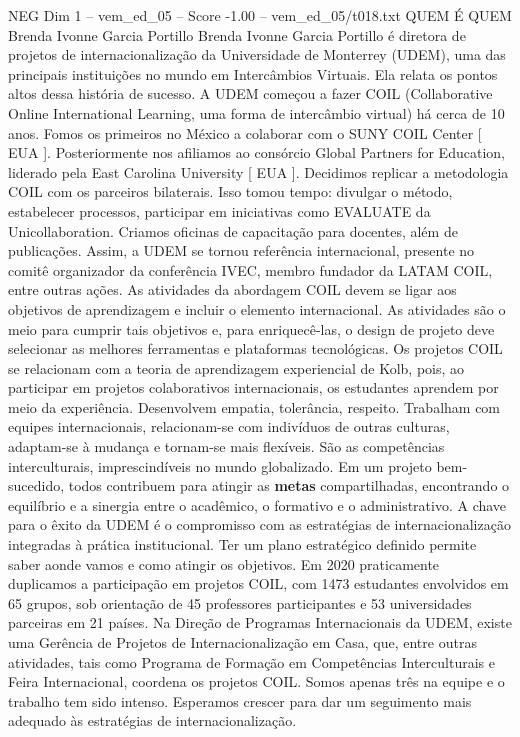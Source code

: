 \begin{textsample}{NEG Dim 1 – vem\_ed\_05 – Score -1.00 – vem\_ed\_05/t018.txt}  \label{ex:f1_neg_004}
QUEM É QUEM Brenda Ivonne Garcia Portillo Brenda Ivonne Garcia Portillo é diretora de projetos de internacionalização da Universidade de Monterrey (UDEM), uma das principais instituições no mundo em Intercâmbios Virtuais.
Ela relata os pontos altos dessa história de sucesso.
A UDEM começou a fazer COIL (Collaborative Online International Learning, uma forma de intercâmbio virtual) há cerca de 10 anos.
Fomos os primeiros no México a colaborar com o SUNY COIL Center [ EUA ].
Posteriormente nos afiliamos ao consórcio Global Partners for Education, liderado pela East Carolina University [ EUA ].
Decidimos replicar a metodologia COIL com os parceiros bilaterais.
Isso tomou tempo: divulgar o método, estabelecer processos, participar em iniciativas como EVALUATE da Unicollaboration.
Criamos oficinas de capacitação para docentes, além de publicações.
Assim, a UDEM se tornou referência internacional, presente no comitê organizador da conferência IVEC, membro fundador da LATAM COIL, entre outras ações.
As atividades da abordagem COIL devem se ligar aos objetivos de aprendizagem e incluir o elemento internacional.
As atividades são o meio para cumprir tais objetivos e, para enriquecê-las, o design de projeto deve selecionar as melhores ferramentas e plataformas tecnológicas.
Os projetos COIL se relacionam com a teoria de aprendizagem experiencial de Kolb, pois, ao participar em projetos colaborativos internacionais, os estudantes aprendem por meio da experiência.
Desenvolvem empatia, tolerância, respeito.
Trabalham com equipes internacionais, relacionam-se com indivíduos de outras culturas, adaptam-se à mudança e tornam-se mais flexíveis.
São as competências interculturais, imprescindíveis no mundo globalizado.
Em um projeto bem-sucedido, todos contribuem para atingir as \textbf{metas} compartilhadas, encontrando o equilíbrio e a sinergia entre o acadêmico, o formativo e o administrativo.
A chave para o êxito da UDEM é o compromisso com as estratégias de internacionalização integradas à prática institucional.
Ter um plano estratégico definido permite saber aonde vamos e como atingir os objetivos.
Em 2020 praticamente duplicamos a participação em projetos COIL, com 1473 estudantes envolvidos em 65 grupos, sob orientação de 45 professores participantes e 53 universidades parceiras em 21 países.
Na Direção de Programas Internacionais da UDEM, existe uma Gerência de Projetos de Internacionalização em Casa, que, entre outras atividades, tais como Programa de Formação em Competências Interculturais e Feira Internacional, coordena os projetos COIL.
Somos apenas três na equipe e o trabalho tem sido intenso.
Esperamos crescer para dar um seguimento mais adequado às estratégias de internacionalização.

\end{textsample}
